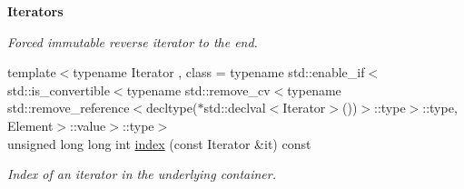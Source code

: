 \begin{Indent}{\bf Iterators}
\begin{DoxyCompactItemize}
\begin{DoxyCompactList}\small\item\em Forced immutable reverse iterator to the end. \end{DoxyCompactList}\item 
{\footnotesize template$<$typename Iterator , class  = typename std\-::enable\-\_\-if$<$std\-::is\-\_\-convertible$<$typename std\-::remove\-\_\-cv$<$typename std\-::remove\-\_\-reference$<$decltype($\ast$std\-::declval$<$\-Iterator$>$())$>$\-::type$>$\-::type, Element$>$\-::value$>$\-::type$>$ }\\unsigned long long int \hyperlink{exceptionmagrathea_1_1SimpleHyperOctree_a7d40a02e2e019d6110ed6151e4cb2d45}{index} (const Iterator \&it) const 
\begin{DoxyCompactList}\small\item\em Index of an iterator in the underlying container. \end{DoxyCompactList}\end{DoxyCompactItemize}
\end{Indent}
